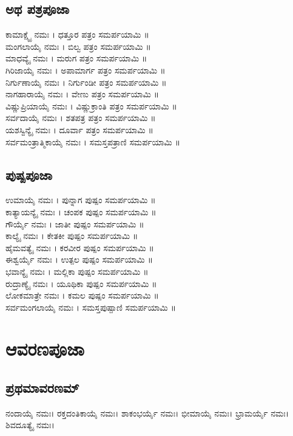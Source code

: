 \subsection{ಅಥ ಪತ್ರಪೂಜಾ}
ಕಾಮಾಕ್ಷ್ಯೈ ನಮಃ । ಧತ್ತೂರ ಪತ್ರಂ ಸಮರ್ಪಯಾಮಿ ॥\\
ಮಂಗಲಾಯೈ ನಮಃ । ಬಿಲ್ವ ಪತ್ರಂ ಸಮರ್ಪಯಾಮಿ ॥\\
ಮಾಧವ್ಯೈ ನಮಃ । ಮರುಗ ಪತ್ರಂ ಸಮರ್ಪಯಾಮಿ ॥\\
ಗಿರಿಜಾಯೈ ನಮಃ । ಅಪಾಮಾರ್ಗ ಪತ್ರಂ ಸಮರ್ಪಯಾಮಿ ॥\\
ನಿರ್ಗುಣಾಯೈ ನಮಃ । ನಿರ್ಗುಂಡೀ ಪತ್ರಂ ಸಮರ್ಪಯಾಮಿ ॥\\
ನಾಗಹಾರಾಯೈ ನಮಃ । ವೇಣು ಪತ್ರಂ ಸಮರ್ಪಯಾಮಿ ॥\\
ವಿಷ್ಣುಪ್ರಿಯಾಯೈ ನಮಃ । ವಿಷ್ಣುಕ್ರಾಂತಿ ಪತ್ರಂ ಸಮರ್ಪಯಾಮಿ ॥\\
ಸರ್ವದಾಯೈ ನಮಃ । ಶತಪತ್ರ ಪತ್ರಂ ಸಮರ್ಪಯಾಮಿ ॥\\
ಯಶಸ್ವಿನ್ಯೈ ನಮಃ । ದೂರ್ವಾ ಪತ್ರಂ ಸಮರ್ಪಯಾಮಿ ॥\\
ಸರ್ವಮಂತ್ರಾತ್ಮಿಕಾಯೈ ನಮಃ । ಸಮಸ್ತಪತ್ರಾಣಿ  ಸಮರ್ಪಯಾಮಿ ॥
\newpage
\subsection{ಪುಷ್ಪಪೂಜಾ}
ಉಮಾಯೈ ನಮಃ । ಪುನ್ನಾಗ ಪುಷ್ಪಂ ಸಮರ್ಪಯಾಮಿ ॥\\
ಕಾತ್ಯಾಯನ್ಯೈ ನಮಃ । ಚಂಪಕ ಪುಷ್ಪಂ ಸಮರ್ಪಯಾಮಿ ॥\\
ಗೌರ್ಯೈ ನಮಃ । ಜಾತೀ ಪುಷ್ಪಂ ಸಮರ್ಪಯಾಮಿ ॥\\
ಕಾಲ್ಯೈ ನಮಃ । ಕೇತಕೀ ಪುಷ್ಪಂ ಸಮರ್ಪಯಾಮಿ ॥\\
ಹೈಮವತ್ಯೈ ನಮಃ । ಕರವೀರ ಪುಷ್ಪಂ ಸಮರ್ಪಯಾಮಿ ॥\\
ಈಶ್ವರ್ಯೈ ನಮಃ । ಉತ್ಪಲ ಪುಷ್ಪಂ ಸಮರ್ಪಯಾಮಿ ॥\\
ಭವಾನ್ಯೈ ನಮಃ । ಮಲ್ಲಿಕಾ ಪುಷ್ಪಂ ಸಮರ್ಪಯಾಮಿ ॥\\
ರುದ್ರಾಣ್ಯೈ ನಮಃ । ಯೂಥಿಕಾ ಪುಷ್ಪಂ ಸಮರ್ಪಯಾಮಿ ॥\\
ಲೋಕಮಾತ್ರೇ ನಮಃ । ಕಮಲ ಪುಷ್ಪಂ ಸಮರ್ಪಯಾಮಿ ॥\\
ಸರ್ವಮಂಗಲಾಯೈ ನಮಃ । ಸಮಸ್ತಪುಷ್ಪಾಣಿ ಸಮರ್ಪಯಾಮಿ ॥

\section{ಆವರಣಪೂಜಾ}
\subsection{ಪ್ರಥಮಾವರಣಮ್}
ನಂದಾಯೈ ನಮಃ।
ರಕ್ತದಂತಿಕಾಯೈ ನಮಃ।
ಶಾಕಂಭರ್ಯೈ ನಮಃ।
ಭೀಮಾಯೈ ನಮಃ।
ಭ್ರಾಮರ್ಯೈ ನಮಃ।
ಶಿವದೂತ್ಯೈ ನಮಃ।\\
